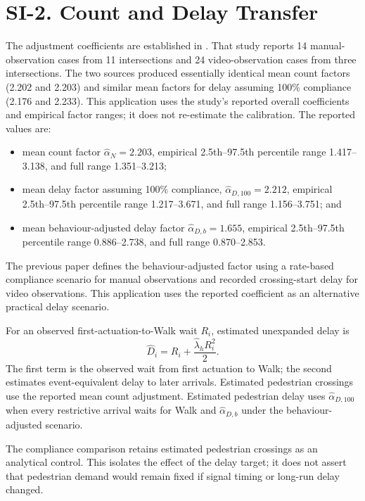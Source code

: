 \documentclass[11pt]{article}
\begin{document}
\section*{SI-2. Count and Delay Transfer}

The adjustment coefficients are established in \citet{levinson2026firstActuationCalibration}. That study reports 14 manual-observation cases from 11 intersections and 24 video-observation cases from three intersections. The two sources produced essentially identical mean count factors (2.202 and 2.203) and similar mean factors for delay assuming 100\% compliance (2.176 and 2.233). This application uses the study's reported overall coefficients and empirical factor ranges; it does not re-estimate the calibration. The reported values are:
\begin{itemize}
  \item mean count factor $\widehat\alpha_N=2.203$, empirical 2.5th--97.5th percentile range 1.417--3.138, and full range 1.351--3.213;
  \item mean delay factor assuming 100\% compliance, $\widehat\alpha_{D,100}=2.212$, empirical 2.5th--97.5th percentile range 1.217--3.671, and full range 1.156--3.751; and
  \item mean behaviour-adjusted delay factor $\widehat\alpha_{D,b}=1.655$, empirical 2.5th--97.5th percentile range 0.886--2.738, and full range 0.870--2.853.
\end{itemize}
The previous paper defines the behaviour-adjusted factor using a rate-based compliance scenario for manual observations and recorded crossing-start delay for video observations. This application uses the reported coefficient as an alternative practical delay scenario.

For an observed first-actuation-to-Walk wait $R_i$, estimated unexpanded delay is
\begin{equation}
\hat D_i=R_i+\frac{\hat\lambda_hR_i^2}{2}.
\end{equation}
The first term is the observed wait from first actuation to Walk; the second estimates event-equivalent delay to later arrivals. Estimated pedestrian crossings use the reported mean count adjustment. Estimated pedestrian delay uses $\widehat\alpha_{D,100}$ when every restrictive arrival waits for Walk and $\widehat\alpha_{D,b}$ under the behaviour-adjusted scenario.

The compliance comparison retains estimated pedestrian crossings as an analytical control. This isolates the effect of the delay target; it does not assert that pedestrian demand would remain fixed if signal timing or long-run delay changed.
\end{document}
